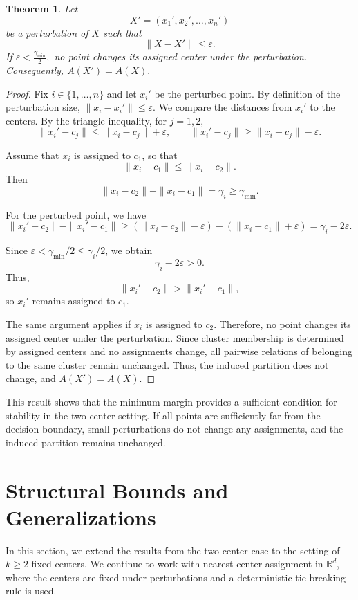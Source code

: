 \documentclass[11pt]{amsart}
\theoremstyle{plain}
\newtheorem{theorem}[subsection]{Theorem}
\theoremstyle{definition}
\begin{document}
\begin{theorem}
Let
\[
X' = (x_1', x_2', \ldots, x_n')
\]
be a perturbation of $X$ such that
\[
\|X - X'\| \le \varepsilon.
\]
If
$\varepsilon < \frac{\gamma_{\min}}{2},$
no point changes its assigned center under the perturbation. Consequently,
$A(X') = A(X).$
\end{theorem}

\begin{proof}
Fix $i \in \{1, \ldots, n\}$ and let $x_i'$ be the perturbed point. By definition of the perturbation size,
$\|x_i - x_i'\| \le \varepsilon.$
We compare the distances from $x_i'$ to the centers. By the triangle inequality, for $j = 1,2$,
\[
\|x_i' - c_j\| \le \|x_i - c_j\| + \varepsilon, \qquad
\|x_i' - c_j\| \ge \|x_i - c_j\| - \varepsilon.
\]

Assume that $x_i$ is assigned to $c_1$, so that
\[
\|x_i - c_1\| \le \|x_i - c_2\|.
\]
Then
\[
\|x_i - c_2\| - \|x_i - c_1\| = \gamma_i \ge \gamma_{\min}.
\]

For the perturbed point, we have
\[
\|x_i' - c_2\| - \|x_i' - c_1\|
\ge (\|x_i - c_2\| - \varepsilon) - (\|x_i - c_1\| + \varepsilon)
= \gamma_i - 2\varepsilon.
\]

Since $\varepsilon < \gamma_{\min}/2 \le \gamma_i/2$, we obtain
\[
\gamma_i - 2\varepsilon > 0.
\]
Thus,
\[
\|x_i' - c_2\| > \|x_i' - c_1\|,
\]
so $x_i'$ remains assigned to $c_1$.

The same argument applies if $x_i$ is assigned to $c_2$. Therefore, no point changes its assigned center under the perturbation. Since cluster membership is determined by assigned centers and no assignments change, all pairwise relations of belonging to the same cluster remain unchanged. Thus, the induced partition does not change, and $A(X') = A(X)$.
\end{proof}

This result shows that the minimum margin provides a sufficient condition for stability in the two-center setting. If all points are sufficiently far from the decision boundary, small perturbations do not change any assignments, and the induced partition remains unchanged.



\section{Structural Bounds and Generalizations}

In this section, we extend the results from the two-center case to the setting of $k \ge 2$ fixed centers. We continue to work with nearest-center assignment in $\mathbb{R}^d$, where the centers are fixed under perturbations and a deterministic tie-breaking rule is used.
\end{document}
